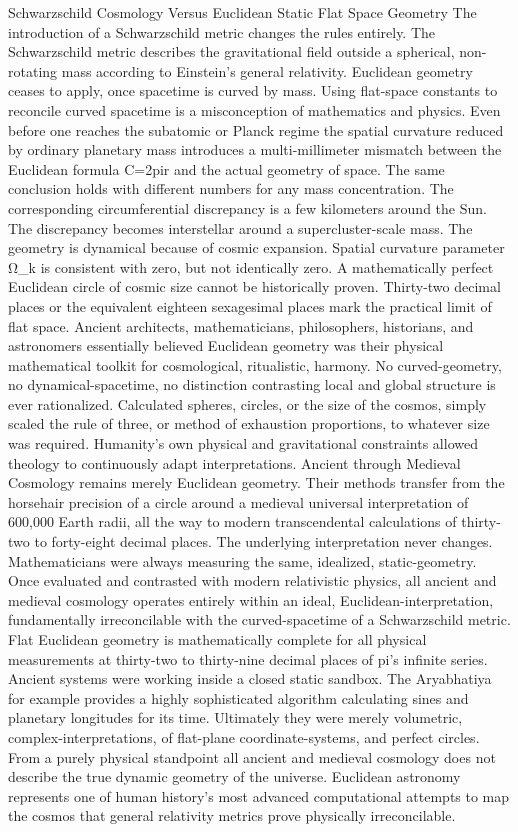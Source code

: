 {Schwarzschild Cosmology Versus Euclidean Static Flat Space Geometry
The introduction of a Schwarzschild metric changes the rules entirely. The Schwarzschild metric describes the gravitational field outside a spherical, non-rotating mass according to Einstein’s general relativity. Euclidean geometry ceases to apply, once spacetime is curved by mass. Using flat-space constants to reconcile curved spacetime is a misconception of mathematics and physics. Even before one reaches the subatomic or Planck regime the spatial curvature reduced by ordinary planetary mass introduces a multi-millimeter mismatch between the Euclidean formula C=2pir and the actual geometry of space. The same conclusion holds with different numbers for any mass concentration. 
The corresponding circumferential discrepancy is a few kilometers around the Sun. The discrepancy becomes interstellar around a supercluster-scale mass. The geometry is dynamical because of cosmic expansion. Spatial curvature parameter Ω_k is consistent with zero, but not identically zero. A mathematically perfect Euclidean circle of cosmic size cannot be historically proven. Thirty-two decimal places or the equivalent eighteen sexagesimal places mark the practical limit of flat space. Ancient architects, mathematicians, philosophers, historians, and astronomers essentially believed Euclidean geometry was their physical mathematical toolkit for cosmological, ritualistic, harmony. No curved-geometry, no dynamical-spacetime, no distinction contrasting local and global structure is ever rationalized. Calculated spheres, circles, or the size of the cosmos, simply scaled the rule of three, or method of exhaustion proportions, to whatever size was required. Humanity’s own physical and gravitational constraints allowed theology to continuously adapt interpretations. 
Ancient through Medieval Cosmology remains merely Euclidean geometry. Their methods transfer from the horsehair precision of a circle around a medieval universal interpretation of 600,000 Earth radii, all the way to modern transcendental calculations of thirty-two to forty-eight decimal places. The underlying interpretation never changes. Mathematicians were always measuring the same, idealized, static-geometry. Once evaluated and contrasted with modern relativistic physics, all ancient and medieval cosmology operates entirely within an ideal, Euclidean-interpretation, fundamentally irreconcilable with the curved-spacetime of a Schwarzschild metric. Flat Euclidean geometry is mathematically complete for all physical measurements at thirty-two to thirty-nine decimal places of pi’s infinite series. Ancient systems were working inside a closed static sandbox. The Aryabhatiya for example provides a highly sophisticated algorithm calculating sines and planetary longitudes for its time. Ultimately they were merely volumetric, complex-interpretations, of flat-plane coordinate-systems, and perfect circles. From a purely physical standpoint all ancient and medieval cosmology does not describe the true dynamic geometry of the universe. Euclidean astronomy represents one of human history’s most advanced computational attempts to map the cosmos that general relativity metrics prove physically irreconcilable. 
}
